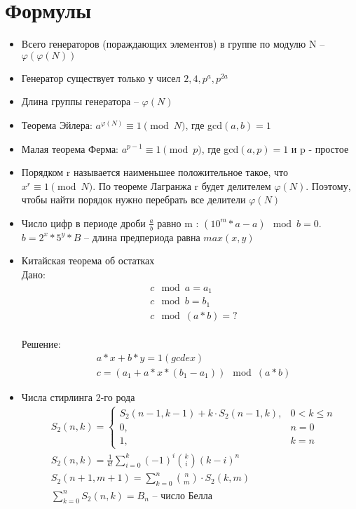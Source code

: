 \documentclass[10pt]{article}
\begin{document}
\section{Формулы}
\begin{itemize}
\item Всего генераторов (пораждающих элементов) в группе по модулю N -- $\varphi(\varphi(N))$
\item Генератор существует только у чисел $2, 4, p^a, p^{2a}$
\item Длина группы генератора -- $\varphi(N)$
\item Теорема Эйлера: $a^{\varphi(N)} \equiv 1 \pmod{N}$, где gcd$(a, b) = 1$
\item Малая теорема Ферма: $a^{p-1} \equiv 1 \pmod{p}$, где gcd$(a, p) = 1$ и p - простое
\item Порядком r называется наименьшее положительное такое, что $x^r \equiv 1 \pmod{N}$.
По теореме Лагранжа r будет делителем $\varphi(N)$. Поэтому, чтобы найти порядок нужно перебрать все делители $\varphi(N)$
\item Число цифр в периоде дроби $\frac{a}{b}$ равно m : $(10^{m}*a - a) \mod{b} = 0$. $b = 2^x*5^y*B$ -- длина предпериода равна $max(x, y)$
\item Китайская теорема об остатках
\\ Дано: 
\begin{equation*}
  \begin{split}
    &c\mod a = a_1 \\
    &c\mod b = b_1 \\
    &c\mod (a * b) = ?
  \end{split}
  \end{equation*}
\\ Решение:
\begin{equation*}
  \begin{split}
    &a*x + b*y = 1 (gcdex)\\
    &c = (a_1 + a * x * (b_1 - a_1)) \mod (a * b)
  \end{split}
  \end{equation*}
\item Числа стирлинга 2-го рода
\begin{equation}
  \begin{split}
    &S_2(n, k) = 
    \left\{
    \begin{array}{cc}
    S_2(n-1, k-1) + k \cdot S_2(n-1, k), & 0 < k \le n\\
    0, & n = 0\\
    1, & k = n
    \end{array}
    \right.\\
    &S_2(n, k) = \frac{1}{k!}\sum\limits_{i=0}^k(-1)^{i}\binom{k}{i}(k - i)^n\\
    &S_2(n + 1, m + 1) = \sum\limits_{k=0}^n\binom{n}{m} \cdot S_2(k, m)\\
    &\sum\limits_{k=0}^nS_2(n, k) = B_n \text{ -- число Белла}
  \end{split}
\end{equation}
\begin{longtable}[c]{lllllllllll}


\end{longtable}
\end{itemize}
\end{document}

